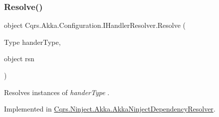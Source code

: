 \subsubsection{\texorpdfstring{Resolve()}{Resolve()}}
{\footnotesize\ttfamily object Cqrs.\+Akka.\+Configuration.\+I\+Handler\+Resolver.\+Resolve (\begin{DoxyParamCaption}\item[{Type}]{hander\+Type,  }\item[{object}]{rsn }\end{DoxyParamCaption})}



Resolves instances of {\itshape hander\+Type} . 



Implemented in \hyperlink{classCqrs_1_1Ninject_1_1Akka_1_1AkkaNinjectDependencyResolver_ab860d9bcf44b62098a8df91bbcb5013d_ab860d9bcf44b62098a8df91bbcb5013d}{Cqrs.\+Ninject.\+Akka.\+Akka\+Ninject\+Dependency\+Resolver}.

